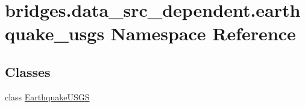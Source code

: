 \hypertarget{namespacebridges_1_1data__src__dependent_1_1earthquake__usgs}{}\section{bridges.\+data\+\_\+src\+\_\+dependent.\+earthquake\+\_\+usgs Namespace Reference}
\label{namespacebridges_1_1data__src__dependent_1_1earthquake__usgs}
\subsection*{Classes}
\begin{DoxyCompactItemize}
\item 
class \mbox{\hyperlink{classbridges_1_1data__src__dependent_1_1earthquake__usgs_1_1_earthquake_u_s_g_s}{Earthquake\+U\+S\+GS}}
\end{DoxyCompactItemize}

